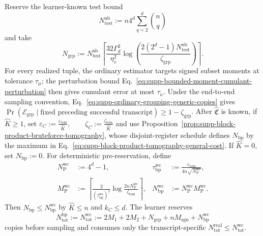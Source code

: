 \documentclass[
  aps,
  prx,
  reprint,
  superscriptaddress,
  amsmath,
  amssymb,
  nofootinbib,
  longbibliography
]{revtex4-2}
\begin{document}
Reserve the learner-known test bound
\begin{equation}
N_{\mathrm{test}}^{\mathrm{ub}}
:=
n4^d
\sum_{q=2}^{d}\binom nq
\label{eq:supp-calibrated-test-bound}
\end{equation}
and take
\begin{equation}
N_{\mathrm{grp}}
:=
N_{\mathrm{test}}^{\mathrm{ub}}
\left\lceil
\frac{32\Gamma_d^2}{\eta_s^2}
\log\!\left(
\frac{2(2^d-1)N_{\mathrm{test}}^{\mathrm{ub}}}
{\zeta_{\mathrm{grp}}}
\right)
\right\rceil.
\label{eq:supp-calibrated-grouping-copies}
\end{equation}
For every realized tuple, the ordinary estimator targets signed subset
moments at tolerance \(\tau_\mu\); the perturbation bound
Eq.~\eqref{eq:supp-bounded-moment-cumulant-perturbation} then gives
cumulant error at most \(\tau_\kappa\).  Under the end-to-end sampling
convention, Eq.~\eqref{eq:supp-ordinary-grouping-generic-copies} gives
\(
\Pr(\mathcal E_{\mathrm{grp}}\mid\text{fixed preceding successful
transcript})\ge1-\zeta_{\mathrm{grp}}
\).
After \(\widehat{\mathfrak C}\) is known, if
\(\widehat K\ge1\), set
$
\varepsilon_C:=\frac{\varepsilon_{\mathrm{tom}}}{\widehat K},
\qquad
\zeta_C:=\frac{\zeta_{\mathrm{tom}}}{\widehat K}
$
and use Proposition~\ref{prop:supp-block-product-bruteforce-tomography},
whose disjoint-register schedule defines $N_{\mathrm{bp}}$ by the maximum in
Eq.~\eqref{eq:supp-block-product-tomography-general-cost}.  If
\(\widehat K=0\), set \(N_{\mathrm{bp}}:=0\).
For deterministic pre-reservation, define
\begin{align}
N_{\mathrm P}^{\mathrm{wc}}
&:=4^d-1,
&
\tau_{\mathrm{bp}}^{\mathrm{wc}}
&:=\frac{\varepsilon_{\mathrm{tom}}}
{4n\sqrt{N_{\mathrm P}^{\mathrm{wc}}}},
\nonumber\\
M_{\mathrm P}^{\mathrm{wc}}
&:=\left\lceil
\frac{2}{(\tau_{\mathrm{bp}}^{\mathrm{wc}})^2}
\log\frac{2nN_{\mathrm P}^{\mathrm{wc}}}{\zeta_{\mathrm{tom}}}
\right\rceil,
&
N_{\mathrm{bp}}^{\mathrm{wc}}
&:=N_{\mathrm P}^{\mathrm{wc}}M_{\mathrm P}^{\mathrm{wc}}.
\end{align}
Then $N_{\mathrm{bp}}\le N_{\mathrm{bp}}^{\mathrm{wc}}$ by
$\widehat K\le n$ and $k_C\le d$.  The learner reserves
\begin{equation}
N_{\mathrm{tot}}^{\mathrm{bp}}
:=N_{\mathrm{tot}}^{\mathrm{wc}}
:=2M_1+2M_2+N_{\mathrm{grp}}+nM_{\mathrm{sgn}}
+N_{\mathrm{bp}}^{\mathrm{wc}}
\label{eq:supp-block-product-main-copy-count-worst-case}
\end{equation}
copies before sampling and consumes only the transcript-specific
$N_{\mathrm{tot}}^{\mathrm{real}}\le N_{\mathrm{tot}}^{\mathrm{wc}}$.
\end{document}
